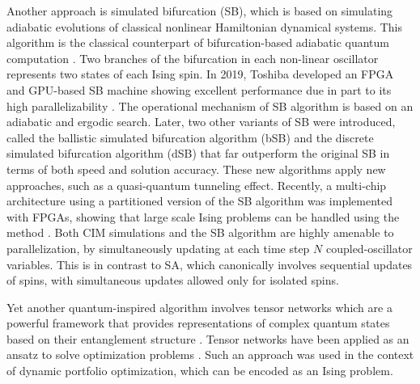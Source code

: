 \documentclass[fleqn,10pt]{wlscirep}
\def\change#1{#1}
\begin{document}
\change{Another approach is simulated bifurcation (SB), which is based on simulating adiabatic evolutions of classical nonlinear Hamiltonian dynamical systems. This algorithm is the classical counterpart of bifurcation-based adiabatic quantum computation \cite{goto2016bifurcation}.} Two branches of the bifurcation in each non-linear oscillator represents two states of each Ising spin. In 2019, Toshiba developed an FPGA and GPU-based SB machine  showing excellent performance due in part to its high parallelizability \cite{goto2019combinatorial,tatsumura2019fpga}. The operational mechanism of SB algorithm is based on an adiabatic and ergodic search.  \change{Later, two other variants of SB  were introduced, called  the ballistic simulated bifurcation algorithm (bSB) and the discrete simulated bifurcation algorithm (dSB) \cite{goto2021high} that far outperform the original SB in terms of both speed and solution accuracy. These new algorithms apply new approaches, such as a quasi-quantum tunneling effect.
Recently, a multi-chip architecture using a partitioned version of the SB algorithm was implemented with FPGAs, showing that large scale Ising problems can be handled using the method \cite{tatsumura2021scaling}.  }
Both CIM simulations and the SB algorithm are highly amenable to parallelization, by simultaneously updating at each time step $N$ coupled-oscillator variables. This is in contrast to SA, which canonically involves sequential updates of spins, with simultaneous updates allowed only for isolated spins. 


Yet another quantum-inspired algorithm involves tensor networks which are a powerful framework that provides representations of complex quantum states based on their entanglement structure \cite{orus2019tensor}. Tensor networks have been applied as an ansatz to solve optimization problems \cite{orus2019tensor, alcazar2021enhancing}.  Such an approach was used in the context of dynamic portfolio optimization, which can be encoded as an Ising problem\cite{mugel2020dynamic}. 
\end{document}
